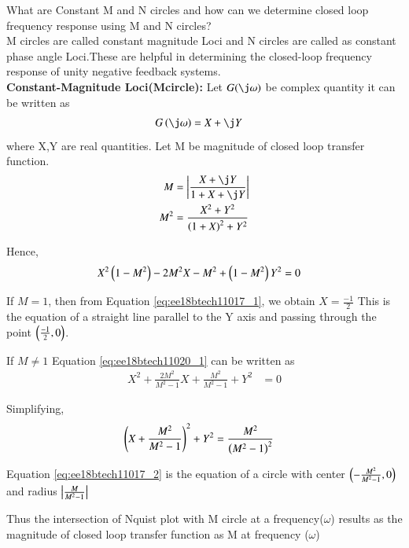 
\item
What are Constant M and N circles and how can we determine closed loop frequency response using M and N circles? \\
\solution 
M circles are called constant magnitude Loci and N circles are called as
constant phase angle Loci.These are helpful in determining the closed-loop frequency response of unity negative feedback systems. \\

\textbf{Constant-Magnitude Loci(Mcircle):} Let $G(\j\omega)$ be complex quantity it can be written as 
\begin{align}
G\brak{\j \omega} &= X+\j Y
\end{align}
where X,Y are real quantities.
Let M be magnitude of closed loop transfer function.
\begin{align}
M &= \abs{\frac{X+\j Y}{1+X+\j Y}}
\\
M^{2} &= \frac{X^{2}+Y^{2}}{\brak{1+X}^{2}+Y^{2}}
\label{eq:ee18btech11020_3}
\end{align}

Hence,
\begin{align}
X^{2}\left(1-M^{2}\right)-2M^{2}X-M^{2}+\left(1-M^{2}\right)Y^{2} &= 0
\label{eq:ee18btech11020_1}
\end{align}

If $M=1$, then from Equation \eqref{eq:ee18btech11017_1}, we obtain $X =\frac{-1}{2}$ This is the equation of a straight line parallel to the Y axis and passing through the point $\left(\frac{-1}{2},0\right)$.

If $M \neq 1$ Equation \eqref{eq:ee18btech11020_1} can be written as
\begin{align}
X^{2}+\frac{2M^{2}}{M^{2}-1}X+\frac{M^{2}}{M^{2}-1}+Y^{2} &= 0
\end{align}

Simplifying,
\begin{align}
\left(X+\frac{M^{2}}{M^{2}-1}\right)^{2}+Y^{2} &= \frac{M^{2}}{\left(M^{2}-1\right)^{2}}
\label{eq:ee18btech11020_2}
\end{align}

Equation \eqref{eq:ee18btech11017_2} is the equation of a circle with center 
$\left(-\frac{M^{2}}{M^{2}-1},0\right)$ and radius $\left\vert\frac{M}{M^{2}-1}\right\vert$

Thus the intersection of Nquist plot with M circle at a frequency($\omega$) results as the magnitude of closed loop transfer function as M at frequency ($\omega$)

